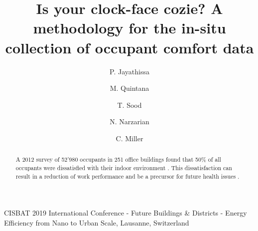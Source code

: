 \documentclass[preprint,11pt,3p]{elsarticle} %
\begin{document}
\begin{frontmatter}


\begin{center}
{CISBAT 2019 International Conference - Future Buildings \& Districts - Energy Efficiency from Nano to Urban Scale, Lausanne, Switzerland}
\end{center}

\title{Is your clock-face cozie? A methodology for the in-situ collection of occupant comfort data} 


\author[buds]{P. Jayathissa}
\address[buds]{Building and Urban Data Science Group,  Department of Building, Singapore} 

\author[buds]{M. Quintana}

\author[buds]{T. Sood}


\author[unsw]{N. Narzarian}
\address[unsw]{University of New South Wales, Australia}



\author[buds]{C. Miller  }




\begin{abstract}

A 2012 survey of 52'980 occupants in 251 office buildings found that 50\% of all occupants were dissatisfied with their indoor environment \cite{frontczak2012quantitative}. This dissatisfaction can result in a reduction of work performance \cite{wargocki2007effects} and be a precursor for future health issues \cite{jaakkola1989sick}. \\


\end{abstract}
\end{frontmatter}
\end{document}
